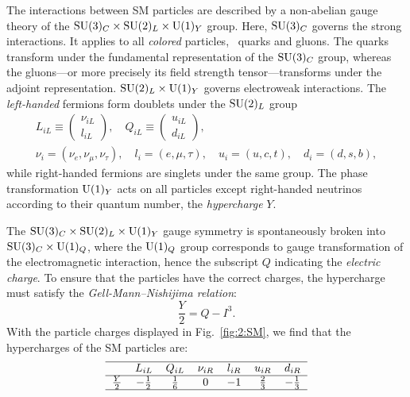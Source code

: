 The interactions between \acs{SM} particles are described by a non-abelian gauge theory of the $\mathrm{SU}(3)_C \times \mathrm{SU}(2)_L \times \mathrm{U}(1)_Y$ group. Here, $\mathrm{SU}(3)_C$ governs the strong interactions. It applies to all \textit{colored} particles, \ie~quarks and gluons. The quarks transform under the fundamental representation of the $\mathrm{SU}(3)_C$ group, whereas the gluons---or more precisely its field strength tensor---transforms under the adjoint representation. $\mathrm{SU}(2)_L \times \mathrm{U}(1)_Y$ governs electroweak interactions. The \textit{left-handed} fermions form doublets under the $\mathrm{SU}(2)_L$ group
\begin{equation}
\begin{gathered}
L_{iL} \equiv \begin{pmatrix}
\nu_{iL} \\
l_{iL}
\end{pmatrix}, \quad Q_{iL} \equiv \begin{pmatrix}
u_{iL} \\
d_{iL}
\end{pmatrix}, \\
\nu_i = \left( \nu_e, \nu_\mu, \nu_\tau \right),\quad  l_i = \left( e, \mu, \tau \right),\quad u_i = \left(u, c, t \right),\quad d_i = \left(d, s, b \right),
\end{gathered}
\end{equation}
while right-handed fermions are singlets under the same group. The phase transformation $\mathrm{U}(1)_Y$ acts on all particles except right-handed neutrinos according to their quantum number, the \textit{hypercharge} $Y$.

The $\mathrm{SU}(3)_C \times \mathrm{SU}(2)_L \times \mathrm{U}(1)_Y$ gauge symmetry is spontaneously broken into $\mathrm{SU}(3)_C \times \mathrm{U}(1)_Q$, where the $\mathrm{U}(1)_Q$ group corresponds to gauge transformation of the electromagnetic interaction, hence the subscript $Q$ indicating the \textit{electric charge}. To ensure that the particles have the correct charges, the hypercharge must satisfy the \textit{Gell-Mann--Nishijima relation}:
\begin{equation}
\frac{Y}{2} = Q - I^3.
\end{equation}
With the particle charges displayed in Fig.~\ref{fig:2:SM}, we find that the hypercharges of the \acs{SM} particles are:
\begin{equation*}
\begin{tabular}{ccccccc}
  \hline
                & $L_{iL}$ & $Q_{iL}$ & $\nu_{iR}$ & $l_{iR}$ & $u_{iR}$ & $d_{iR}$ \\ \hline
  $\frac{Y}{2}$ & $-\frac{1}{2}$ & $\frac{1}{6}$ & $0$ & $-1$ & $\frac{2}{3}$ & $-\frac{1}{3}$ \\ \hline
\end{tabular}
\end{equation*}

